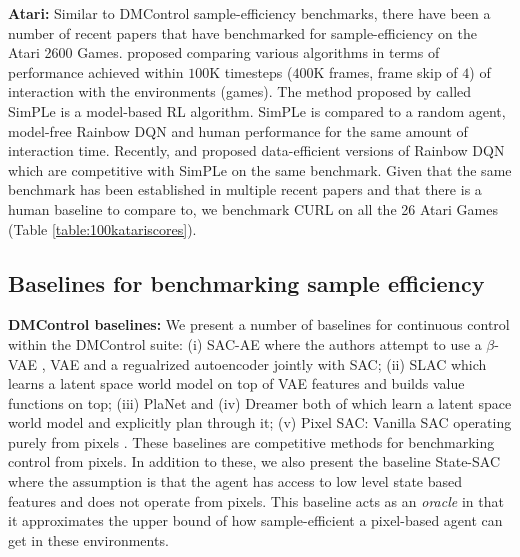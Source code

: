 {\textbf{Atari:}} Similar to DMControl sample-efficiency benchmarks, there have been a number of recent papers that have benchmarked for sample-efficiency on the Atari 2600 Games. \citet{kaiser2019model} proposed comparing various algorithms in terms of performance achieved within $100$K timesteps ($400$K frames, frame skip of $4$) of interaction with the environments (games). The method proposed by \citet{kaiser2019model} called SimPLe is a model-based RL algorithm. SimPLe is compared to a random agent, model-free Rainbow DQN \cite{hessel2017rainbow} and human performance for the same amount of interaction time. Recently, \citet{van2019use} and \citet{kielak2020rainbow} proposed data-efficient versions of Rainbow DQN which are competitive with SimPLe on the same benchmark. Given that the same benchmark has been established in multiple recent papers and that there is a human baseline to compare to, we benchmark CURL on all the 26 Atari Games (Table \ref{table:100katariscores}).

\subsection{Baselines for benchmarking sample efficiency}
\textbf{DMControl baselines:} We present a number of baselines for continuous control within the DMControl suite: (i) SAC-AE \cite{yarats2019improving} where the authors attempt to use a $\beta$-VAE \cite{higgins2017darla}, VAE \cite{kingma2013auto} and a regualrized autoencoder \citet{vincent2008extracting,ghosh2019} jointly with SAC; (ii) SLAC \cite{lee2019stochastic} which learns a latent space world model on top of VAE features \citet{ha2018world} and builds value functions on top; (iii) PlaNet and (iv) Dreamer \cite{hafner2018learning, hafner2019dream} both of which learn a latent space world model and explicitly plan through it; (v) Pixel SAC: Vanilla SAC operating purely from pixels \cite{haarnoja2018soft}. These baselines are competitive methods for benchmarking control from pixels. In addition to these, we also present the baseline State-SAC where the assumption is that the agent has access to low level state based features and does not operate from pixels. This baseline acts as an {\it oracle} in that it approximates the upper bound of how sample-efficient a pixel-based agent can get in these environments. 


